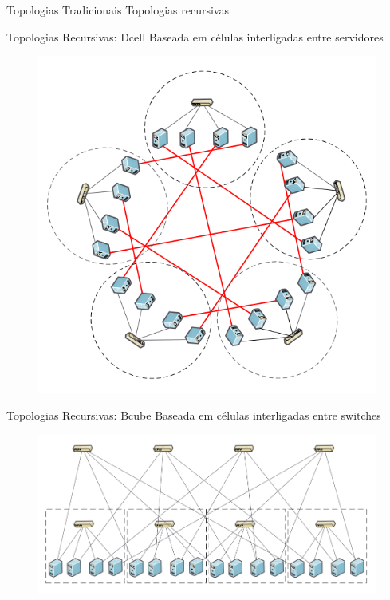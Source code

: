 \documentclass[aspectratio=169]{beamer}
\begin{document}
    	\begin{frame} {Topologias Tradicionais}
			Topologias recursivas
		\end{frame}

		\begin{frame} {Topologias Recursivas: Dcell}
			Baseada em células interligadas entre servidores
			\begin{figure}[ht]    
				\includegraphics[scale=0.3]{imagens/dcell.png}
				\label{fig:sample_figure}
			\end{figure}
		\end{frame}

		\begin{frame} {Topologias Recursivas: Bcube}
			Baseada em células interligadas entre switches
			\begin{figure}[ht]    
				\includegraphics[scale=0.3]{imagens/bcube.png}
				\label{fig:sample_figure}
			\end{figure}
		\end{frame}
\end{document}
